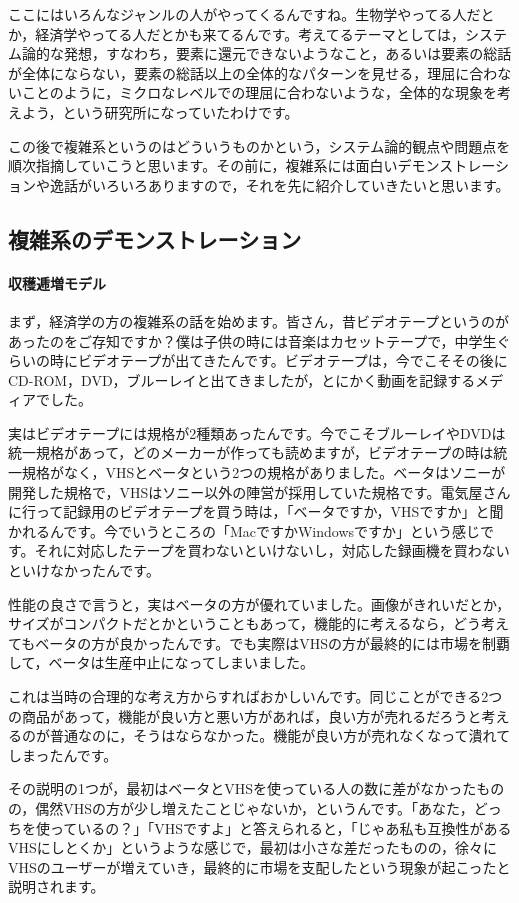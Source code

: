 \documentclass{ltjsbook}
\begin{document}
ここにはいろんなジャンルの人がやってくるんですね。生物学やってる人だとか，経済学やってる人だとかも来てるんです。考えてるテーマとしては，システム論的な発想，すなわち，要素に還元できないようなこと，あるいは要素の総話が全体にならない，要素の総話以上の全体的なパターンを見せる，理屈に合わないことのように，ミクロなレベルでの理屈に合わないような，全体的な現象を考えよう，という研究所になっていたわけです。


この後で複雑系というのはどういうものかという，システム論的観点や問題点を順次指摘していこうと思います。その前に，複雑系には面白いデモンストレーションや逸話がいろいろありますので，それを先に紹介していきたいと思います。
\subsection{複雑系のデモンストレーション}
\paragraph{収穫逓増モデル}

まず，経済学の方の複雑系の話を始めます。皆さん，昔ビデオテープというのがあったのをご存知ですか？僕は子供の時には音楽はカセットテープで，中学生ぐらいの時にビデオテープが出てきたんです。ビデオテープは，今でこそその後にCD-ROM，DVD，ブルーレイと出てきましたが，とにかく動画を記録するメディアでした。

実はビデオテープには規格が2種類あったんです。今でこそブルーレイやDVDは統一規格があって，どのメーカーが作っても読めますが，ビデオテープの時は統一規格がなく，VHSとベータという2つの規格がありました。ベータはソニーが開発した規格で，VHSはソニー以外の陣営が採用していた規格です。電気屋さんに行って記録用のビデオテープを買う時は，「ベータですか，VHSですか」と聞かれるんです。今でいうところの「MacですかWindowsですか」という感じです。それに対応したテープを買わないといけないし，対応した録画機を買わないといけなかったんです。

性能の良さで言うと，実はベータの方が優れていました。画像がきれいだとか，サイズがコンパクトだとかということもあって，機能的に考えるなら，どう考えてもベータの方が良かったんです。でも実際はVHSの方が最終的には市場を制覇して，ベータは生産中止になってしまいました。

これは当時の合理的な考え方からすればおかしいんです。同じことができる2つの商品があって，機能が良い方と悪い方があれば，良い方が売れるだろうと考えるのが普通なのに，そうはならなかった。機能が良い方が売れなくなって潰れてしまったんです。

その説明の1つが，最初はベータとVHSを使っている人の数に差がなかったものの，偶然VHSの方が少し増えたことじゃないか，というんです。「あなた，どっちを使っているの？」「VHSですよ」と答えられると，「じゃあ私も互換性があるVHSにしとくか」というような感じで，最初は小さな差だったものの，徐々にVHSのユーザーが増えていき，最終的に市場を支配したという現象が起こったと説明されます。
\end{document}
